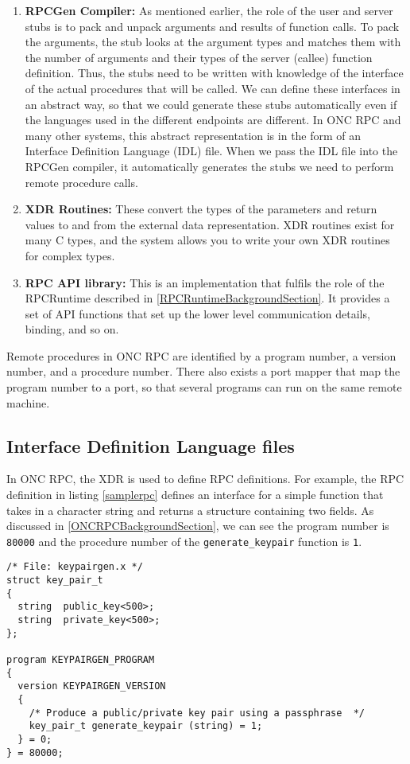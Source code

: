 \begin{enumerate}
	\item \textbf{RPCGen Compiler:} As mentioned earlier, the role of the user and server stubs is to pack and unpack arguments and results of function calls. To pack the arguments, the stub looks at the argument types and matches them with the number of arguments and their types of the server (callee) function definition. Thus, the stubs need to be written with knowledge of the interface of the actual procedures that will be called. We can define these interfaces in an abstract way, so that we could generate these stubs automatically even if the languages used in the different endpoints are different. In ONC RPC and many other systems, this abstract representation is in the form of an Interface Definition Language (IDL) file. When we pass the IDL file into the RPCGen compiler, it automatically generates the stubs we need to perform remote procedure calls.
	\item \textbf{XDR Routines:} These convert the types of the parameters and return values to and from the external data representation. XDR routines exist for many C types, and the system allows you to write your own XDR routines for complex types.
	\item \textbf{RPC API library:} This is an implementation that fulfils the role of the RPCRuntime described in \ref{RPCRuntimeBackgroundSection}. It provides a set of API functions that set up the lower level communication details, binding, and so on.
\end{enumerate}

Remote procedures in ONC RPC are identified by a program number, a version number, and a procedure number. There also exists a port mapper that map the program number to a port, so that several programs can run on the same remote machine. 

\subsection{Interface Definition Language files}
In ONC RPC, the XDR is used to define RPC definitions. For example, the RPC definition in listing \ref{samplerpc} defines an interface for a simple function that takes in a character string  and returns a structure containing two fields. As discussed in \ref{ONCRPCBackgroundSection}, we can see the program number is \verb+80000+ and the procedure number of the \verb+generate_keypair+ function is \verb+1+.

\begin{lstlisting}
/* File: keypairgen.x */
struct key_pair_t
{
  string  public_key<500>;
  string  private_key<500>;
};

program KEYPAIRGEN_PROGRAM
{
  version KEYPAIRGEN_VERSION
  {
    /* Produce a public/private key pair using a passphrase  */
    key_pair_t generate_keypair (string) = 1;
  } = 0;
} = 80000;
\end{lstlisting}

